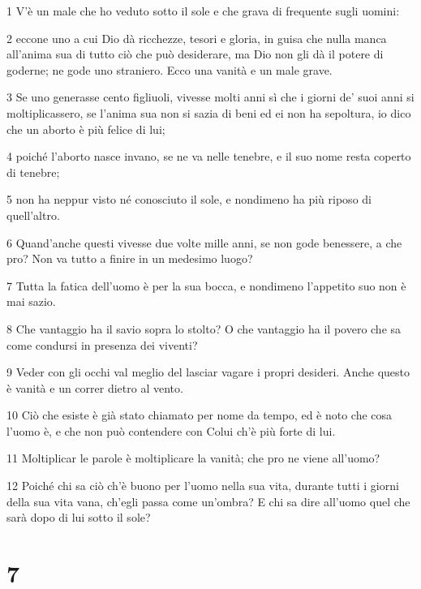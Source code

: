 \par 1 V'è un male che ho veduto sotto il sole e che grava di frequente sugli uomini:
\par 2 eccone uno a cui Dio dà ricchezze, tesori e gloria, in guisa che nulla manca all'anima sua di tutto ciò che può desiderare, ma Dio non gli dà il potere di goderne; ne gode uno straniero. Ecco una vanità e un male grave.
\par 3 Se uno generasse cento figliuoli, vivesse molti anni sì che i giorni de' suoi anni si moltiplicassero, se l'anima sua non si sazia di beni ed ei non ha sepoltura, io dico che un aborto è più felice di lui;
\par 4 poiché l'aborto nasce invano, se ne va nelle tenebre, e il suo nome resta coperto di tenebre;
\par 5 non ha neppur visto né conosciuto il sole, e nondimeno ha più riposo di quell'altro.
\par 6 Quand'anche questi vivesse due volte mille anni, se non gode benessere, a che pro? Non va tutto a finire in un medesimo luogo?
\par 7 Tutta la fatica dell'uomo è per la sua bocca, e nondimeno l'appetito suo non è mai sazio.
\par 8 Che vantaggio ha il savio sopra lo stolto? O che vantaggio ha il povero che sa come condursi in presenza dei viventi?
\par 9 Veder con gli occhi val meglio del lasciar vagare i propri desideri. Anche questo è vanità e un correr dietro al vento.
\par 10 Ciò che esiste è già stato chiamato per nome da tempo, ed è noto che cosa l'uomo è, e che non può contendere con Colui ch'è più forte di lui.
\par 11 Moltiplicar le parole è moltiplicare la vanità; che pro ne viene all'uomo?
\par 12 Poiché chi sa ciò ch'è buono per l'uomo nella sua vita, durante tutti i giorni della sua vita vana, ch'egli passa come un'ombra? E chi sa dire all'uomo quel che sarà dopo di lui sotto il sole?

\chapter{7}

